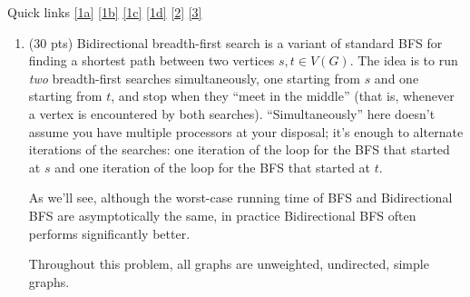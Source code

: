 \documentclass[12pt]{article}
\begin{document}
\renewcommand{\headrulewidth}{0.5pt}
\phantom{Test}

Quick links \ref{1a} \ref{1b} \ref{1c} \ref{1d} \ref{2} \ref{3}


\vspace{-3mm}
\begin{enumerate}

	\item (30 pts) Bidirectional breadth-first search is a variant of standard BFS for finding a shortest path between two vertices $s,t \in V(G)$. The idea is to run \emph{two} breadth-first searches simultaneously, one starting from $s$ and one starting from $t$, and stop when they ``meet in the middle'' (that is, whenever a vertex is encountered by both searches). ``Simultaneously'' here doesn't assume you have multiple processors at your disposal; it's enough to alternate iterations of the searches: one iteration of the loop for the BFS that started at $s$ and one iteration of the loop for the BFS that started at $t$.
	
	As we'll see, although the worst-case running time of BFS and Bidirectional BFS are asymptotically the same, in practice Bidirectional BFS often performs significantly better.
	
	Throughout this problem, all graphs are unweighted, undirected, simple graphs.
	

\end{enumerate}
\end{document}
